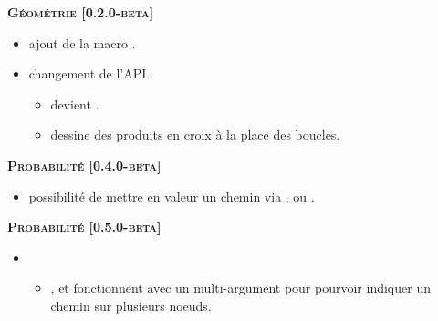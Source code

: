 \documentclass[12pt,a4paper]{book}
\begin{document}
\begin{description}
\begin{itemize}[itemsep=.5em]
\end{itemize}


\separation




\begin{center}
    \textbf{\textsc{Géométrie [0.2.0-beta]}}
\end{center}

\begin{itemize}[itemsep=.5em]
    \item {}
          ajout de la macro .


    \item {} changement de l'API.
    \begin{itemize}[itemsep=.5em]
        \item {} devient .

        \item {} dessine des produits en croix à la place des boucles.
    \end{itemize}


\end{itemize}


\separation




\begin{center}
    \textbf{\textsc{Probabilité [0.4.0-beta]}}
\end{center}

\begin{itemize}[itemsep=.5em]
    \item {}
    	  possibilité de mettre en valeur un chemin via ,   ou .
\end{itemize}


\begin{center}
    \textbf{\textsc{Probabilité [0.5.0-beta]}}
\end{center}

\begin{itemize}[itemsep=.5em]
    \item {}
    \begin{itemize}[itemsep=.5em]
        \item {},  et  fonctionnent avec un multi-argument pour pourvoir indiquer un chemin sur plusieurs noeuds.
        

\end{itemize}
\end{itemize}
\end{description}
\end{document}
